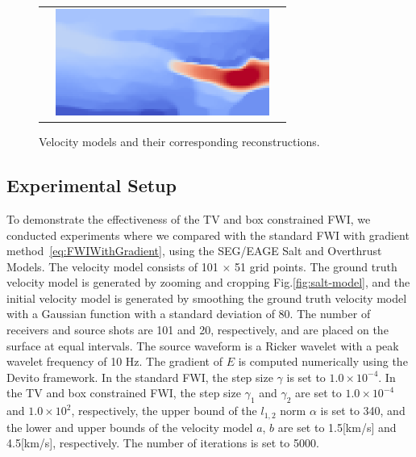 \begin{figure}[htbp]
\begin{tabular}{m{68mm} m{70mm} m{10mm}}
\begin{minipage}[b]{70mm}
            \vspace{-8mm}
            \caption*{Initial model}
        \end{minipage} &
        \begin{minipage}[b]{70mm}
            \centering
            \includegraphics[width=70mm]{public/pds}
            \vspace{-8mm}
            \caption*{Reconstructed with the constrained FWI}
        \end{minipage} &
    \end{tabular}
    \caption{Velocity models and their corresponding reconstructions.}
    \label{fig:velocity-models}
\end{figure}


\subsection{Experimental Setup}\label{subsec:experimental-setup}

To demonstrate the effectiveness of the TV and box constrained FWI, we conducted experiments where we compared with the standard FWI with gradient method~\eqref{eq:FWIWithGradient}, using the SEG/EAGE Salt and Overthrust Models.
The velocity model consists of 101 $\times$ 51 grid points.
The ground truth velocity model is generated by zooming and cropping Fig.\ref{fig:salt-model}, and the initial velocity model is generated by smoothing the ground truth velocity model with a Gaussian function with a standard deviation of 80.
The number of receivers and source shots are 101 and 20, respectively, and are placed on the surface at equal intervals.
The source waveform is a Ricker wavelet with a peak wavelet frequency of 10 Hz.
The gradient of $E$ is computed numerically using the Devito framework\cite{devito}.
In the standard FWI, the step size $\gamma$ is set to $1.0 \times 10^{-4}$.
In the TV and box constrained FWI, the step size $\gamma_1$ and $\gamma_2$ are set to $1.0 \times 10^{-4}$ and $1.0 \times 10^2$, respectively, the upper bound of the $l_{1,2}$ norm $\alpha$ is set to 340, and the lower and upper bounds of the velocity model $a$, $b$ are set to 1.5[km/s] and 4.5[km/s], respectively.
The number of iterations is set to 5000.


